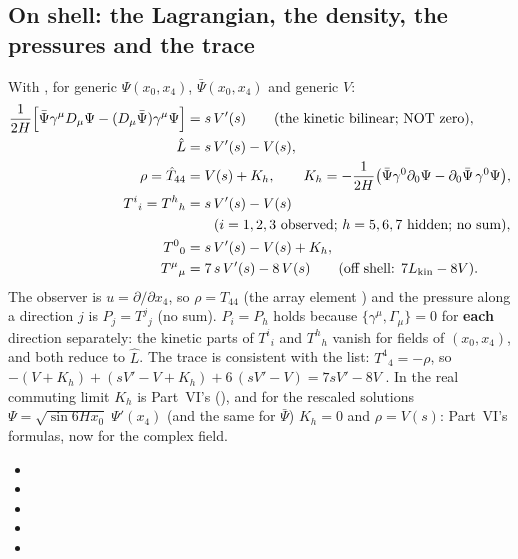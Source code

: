 \subsection{On shell: the Lagrangian, the density, the pressures and the trace}
\label{sec:7.4}

With , for generic $\Psi(x_0,x_4)$, $\bar\Psi(x_0,x_4)$ and generic $V$:
\begin{align*}
  \frac{1}{2H}\Bigl[\bar\Psi\gamma^\mu D_\mu\Psi-(D_\mu\bar\Psi)\gamma^\mu\Psi\Bigr]&=s\,V'(s)
    \qquad\text{(the kinetic bilinear; NOT zero)},\\
  \hat L&=s\,V'(s)-V(s),\\
  \rho=\hat T_{44}&=V(s)+K_h,\qquad K_h=-\frac{1}{2H}\bigl(\bar\Psi\gamma^0\partial_0\Psi-\partial_0\bar\Psi\,\gamma^0\Psi\bigr),\\
  T^i{}_i=T^h{}_h&=s\,V'(s)-V(s)\\
    &\qquad(i=1,2,3\text{ observed; } h=5,6,7\text{ hidden; no sum}),\\
  T^0{}_0&=s\,V'(s)-V(s)+K_h,\\
  T^\mu{}_\mu&=7\,s\,V'(s)-8\,V(s)\qquad(\text{off shell: } 7L_{\mathrm{kin}}-8V).
\end{align*}
The observer is $u=\partial/\partial x_4$, so $\rho=T_{44}$ (the array element \cfcode{[[5,5]]}) and
the pressure along a direction $j$ is $P_j=T^j{}_j$ (no sum). $P_i=P_h$ holds because
$\{\gamma^\mu,\Gamma_\mu\}=0$ for \textbf{each} direction separately: the kinetic parts of $T^i{}_i$
and $T^h{}_h$ vanish for fields of $(x_0,x_4)$, and both reduce to $\hat L$. The trace is consistent
with the list: $T^4{}_4=-\rho$, so $-(V+K_h)+(sV'-V+K_h)+6\,(sV'-V)=7sV'-8V$ \cfderived. In the real
commuting limit $K_h$ is Part~VI's  (), and for the rescaled solutions
$\Psi=\sqrt{\sin 6Hx_0}\;\Psi'(x_4)$ (and the same for $\bar\Psi$) $K_h=0$ and $\rho=V(s)$: Part~VI's
formulas, now for the complex field. 
\begin{itemize}
  \item {}
  \item {}
  \item {}
  \item {}
  \item {}
\end{itemize}

